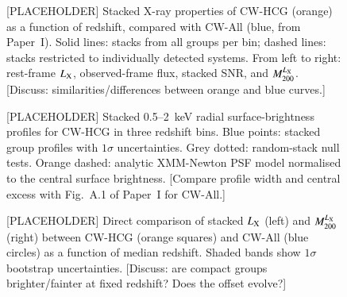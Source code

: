 \documentclass{aa}
\begin{document}
\begin{figure}
\centering
\caption{[PLACEHOLDER] Stacked X-ray properties of CW-HCG (orange) as a function of redshift, compared with CW-All (blue, from Paper~I). Solid lines: stacks from all groups per bin; dashed lines: stacks restricted to individually detected systems. From left to right: rest-frame $L_{\rm X}$, observed-frame flux, stacked SNR, and $M_{200}^{L_{\rm X}}$. [Discuss: similarities/differences between orange and blue curves.]}
\label{fig:stacking_hcg}
\end{figure}

\begin{figure}
\centering
\caption{[PLACEHOLDER] Stacked 0.5--2~keV radial surface-brightness profiles for CW-HCG in three redshift bins. Blue points: stacked group profiles with $1\sigma$ uncertainties. Grey dotted: random-stack null tests. Orange dashed: analytic XMM-Newton PSF model normalised to the central surface brightness. [Compare profile width and central excess with Fig.~A.1 of Paper~I for CW-All.]}
\label{fig:profiles_hcg}
\end{figure}

\begin{figure}
\centering
\caption{[PLACEHOLDER] Direct comparison of stacked $L_{\rm X}$ (left) and $M_{200}^{L_{\rm X}}$ (right) between CW-HCG (orange squares) and CW-All (blue circles) as a function of median redshift. Shaded bands show $1\sigma$ bootstrap uncertainties. [Discuss: are compact groups brighter/fainter at fixed redshift? Does the offset evolve?]}
\label{fig:comparison_stacks}
\end{figure}
\end{document}
